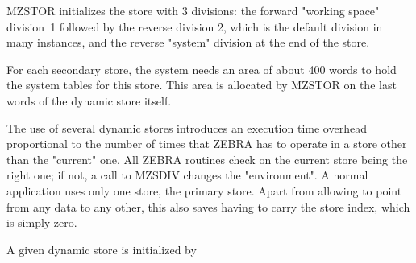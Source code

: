 MZSTOR initializes the store with 3 divisions:
the forward "working space" division~1
followed by the reverse division 2, which is the default division
in many instances, and the reverse "system" division
at the end of the store.

For each secondary store, the system needs an area of
about 400 words to hold the system tables for this store.
This area is allocated by MZSTOR on the last words
of the dynamic store itself.

The use of several dynamic stores introduces an execution time
overhead proportional to the number of times that ZEBRA has to
operate in a store other than the "current" one.
All ZEBRA routines check on the current store being the right one;
if not, a call to MZSDIV changes the "environment".
A normal application uses only one store, the primary store.
Apart from allowing to point from any data to any other,
this also saves having to carry the store index,
which is simply zero.

\lile{-4mm} %

A given dynamic store is initialized by

